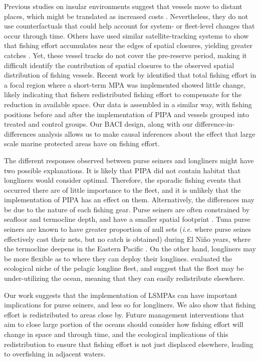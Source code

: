 \documentclass[11pt,]{article}
\begin{document}
Previous studies on insular environments suggest that vessels move to
distant places, which might be translated as increased costs
\citep{stevenson_2013}. Nevertheless, they do not use counterfactuals
that could help account for system- or fleet-level changes that occur
through time. Others have used similar satellite-tracking systems to
show that fishing effort accumulates near the edges of spatial closures,
yielding greater catches \citep{murawski_2005}. Yet, these vessel tracks
do not cover the pre-reserve period, making it difficult identify the
contribution of spatial closures to the observed spatial distribution of
fishing vessels. Recent work by \citet{elahi_2018} identified that total
fishing effort in a focal region where a short-term MPA was implemented
showed little change, likely indicating that fishers redistributed
fishing effort to compensate for the reduction in available space. Our
data is assembled in a similar way, with fishing positions before and
after the implementation of PIPA and vessels grouped into treated and
control groups. Our BACI design, along with our
difference-in-differences analysis allows us to make causal inferences
about the effect that large scale marine protected areas have on fishing
effort.

The different responses observed between purse seiners and longliners
might have two possible explanations. It is likely that PIPA did not
contain habitat that longliners would consider optimal. Therefore, the
sporadic fishing events that occurred there are of little importance to
the fleet, and it is unlikely that the implementation of PIPA has an
effect on them. Alternatively, the differences may be due to the nature
of each fishing gear. Purse seiners are often constrained by seafloor
and termocline depth, and have a smaller spatial footprint
\citep{kroodsma_2018}. Tuna purse seiners are known to have greater
proportion of null sets (\emph{i.e.} where purse seines effectively cast
their nets, but no catch is obtained) during El Niño years, where the
termocline deepens in the Eastern Pacific \citep{dreyfusleon_2015}. On
the other hand, longliners may be more flexible as to where they can
deploy their longlines. \citet{ortuocrespo_2018} evaluated the
ecological niche of the pelagic longline fleet, and suggest that the
fleet may be under-utilizing the ocean, meaning that they can easily
redistribute elsewhere.

Our work suggests that the implementation of LSMPAs can have important
implications for purse seiners, and less so for longliners. We also show
that fishing effort is redistributed to areas close by. Future
management interventions that aim to close large portion of the oceans
should consider how fishing effort will change in space and through
time, and the ecological implications of this redistribution to ensure
that fishing effort is not just displaced elsewhere, leading to
overfishing in adjacent waters.
\end{document}
